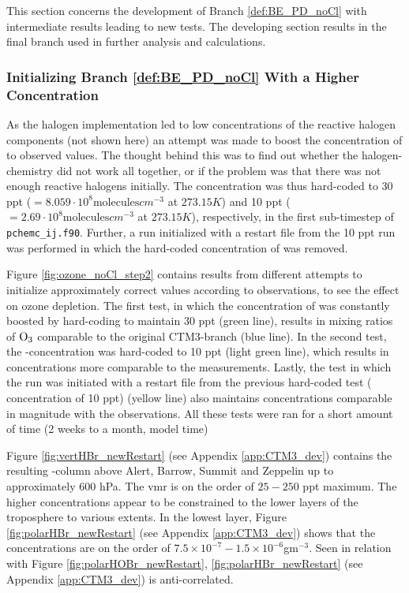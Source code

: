 This section concerns the development of Branch \ref{def:BE_PD_noCl} with intermediate results leading to new tests. The developing section results in the final branch used in further analysis and calculations. 

\subsubsection{Initializing Branch \ref{def:BE_PD_noCl} With a Higher  Concentration}\label{sec:res_step2}

As the halogen implementation led to low concentrations of the reactive halogen components (not shown here) an attempt was made to boost the concentration of  to observed values. The thought behind this was to find out whether the halogen-chemistry did not work all together, or if the problem was that there was not enough reactive halogens initially. The concentration was thus hard-coded to 30 ppt ($= 8.059\cdot10^8 \text{molecules}cm^{-3}$ at $273.15 K$) and 10 ppt ($= 2.69\cdot10^8 \text{molecules}cm^{-3}$ at $273.15 K$), respectively, in the first sub-timestep of \texttt{pchemc\_ij.f90}. Further, a run initialized with a restart file from the 10 ppt run was performed in which the hard-coded concentration of  was removed.

\medskip

Figure \ref{fig:ozone_noCl_step2} contains results from different attempts to initialize  approximately correct values according to observations, to see the effect on ozone depletion. The first test, in which the concentration of  was constantly boosted by hard-coding to maintain 30 ppt (green line), results in mixing ratios of $\mathrm{O_3}$ comparable to the original CTM3-branch (blue line). In the second test, the -concentration was hard-coded to 10 ppt (light green line), which results in concentrations more comparable to the measurements. Lastly, the test in which the run was initiated with a restart file from the previous hard-coded test ( concentration of 10 ppt) (yellow line) also maintains concentrations comparable in magnitude with the observations. All these tests were ran for a short amount of time (2 weeks to a month, model time)



\medskip

Figure \ref{fig:vertHBr_newRestart} (see Appendix \ref{app:CTM3_dev}) contains the resulting -column above Alert, Barrow, Summit and Zeppelin up to approximately $600$ hPa. The \acrshort{vmr} is on the order of $25 - 250$ ppt maximum. The higher concentrations appear to be constrained to the lower layers of the troposphere to various extents. In the lowest layer, Figure \ref{fig:polarHBr_newRestart} (see Appendix \ref{app:CTM3_dev}) shows that the concentrations are on the order of $7.5\times10^{-7} - 1.5\times10^{-6}$gm$^{-3}$. Seen in relation with Figure \ref{fig:polarHOBr_newRestart}, \ref{fig:polarHBr_newRestart} (see Appendix \ref{app:CTM3_dev}) is anti-correlated. 

